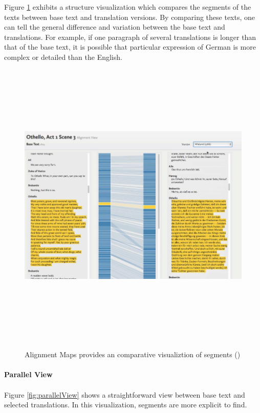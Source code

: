 Figure \ref{fig:alignmentMap} exhibits a structure visualization which compares the segments of the texts between base text and translation versions. By comparing these texts, one can tell the general difference and variation between the base text and translations. For example, if one paragraph of several translations is longer than that of the base text, it is possible that particular expression of German is more complex or detailed than the English. 

\begin{figure}[h] 
	\centering	
	\includegraphics[width=16cm, height=14cm]{Figs/Alignment-Map}\\[1ex]
	\caption{Alignment Maps provides an comparative visualiztion of segments (\cite{Cheesman2012})}
	\label{fig:alignmentMap}
\end{figure} 

\paragraph{Parallel View}
\paragraph[]{}

Figure \ref{fig:parallelView} shows a straightforward view between base text and selected translations. In this visualization, segments are more explicit to find.

